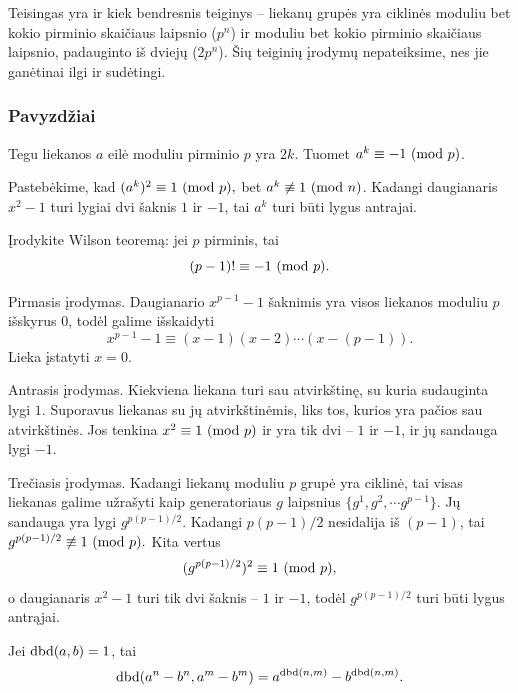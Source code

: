 Teisingas yra ir kiek bendresnis teiginys -- liekanų grupės yra ciklinės
moduliu bet kokio pirminio skaičiaus laipsnio ($p^n$) ir moduliu bet kokio
pirminio skaičiaus laipsnio, padauginto iš dviejų ($2p^n$). Šių teiginių
įrodymų nepateiksime, nes jie ganėtinai ilgi ir sudėtingi.

\subsubsection{Pavyzdžiai}
\begin{pavnr}
  Tegu liekanos $a$ eilė moduliu pirminio $p$ yra $2k$. Tuomet $a^k \equiv -1
  \ (\text{mod } p)$.
\end{pavnr}

\begin{sprendimas}
Pastebėkime, kad $(a^k)^2 \equiv 1 \ (\text{mod } p),$ bet $a^k \not \equiv 1 \ (\text{mod } n)$.
Kadangi daugianaris $x^2-1$ turi lygiai dvi šaknis $1$ ir $-1$, tai $a^k$
turi būti lygus antrajai.
\end{sprendimas}

\begin{pavnr}
  Įrodykite Wilson teoremą: jei $p$ pirminis, tai $$(p-1)! \equiv -1
  \ (\text{mod } p).$$
\end{pavnr}

\begin{sprendimas}
Pirmasis įrodymas. Daugianario $x^{p-1} - 1$ šaknimis yra visos liekanos
moduliu $p$ išskyrus $0$, todėl galime išskaidyti $$x^{p-1} - 1\equiv
(x-1)(x-2)\cdots(x-(p-1)).$$ Lieka įstatyti $x = 0$.

Antrasis įrodymas. Kiekviena liekana turi sau atvirkštinę, su kuria
sudauginta lygi $1$. Suporavus liekanas su jų atvirkštinėmis, liks tos,
kurios yra pačios sau atvirkštinės. Jos tenkina $x^2 \equiv 1\ (\text{mod } p)$ ir yra
tik dvi -- $1$ ir $-1$, ir jų sandauga lygi $-1$.

Trečiasis įrodymas. Kadangi liekanų moduliu $p$ grupė yra ciklinė, tai
visas liekanas galime užrašyti kaip generatoriaus $g$ laipsnius
$\{g^1, g^2, \cdots g^{p-1}\}$. Jų sandauga yra lygi $g^{p(p-1)/2}$.
Kadangi $p(p-1)/2$ nesidalija iš $(p-1)$, tai $g^{p(p-1)/2} \not \equiv 1
\ (\text{mod } p).$ Kita vertus $$(g^{p(p-1)/2})^2 \equiv 1 \ (\text{mod } p),$$ o daugianaris $x^2-1$
turi tik dvi šaknis -- $1$ ir $-1$, todėl $g^{p(p-1)/2}$ turi būti lygus
antrąjai. 
\end{sprendimas}

\begin{pavnr}
  Jei $\operatorname{dbd}(a,b) = 1$, tai $$\operatorname{dbd}(a^n - b^n, a^m - b^m) = a^{\operatorname{dbd}(n,m)} -
  b^{\operatorname{dbd}(n,m)}.$$
\end{pavnr}

